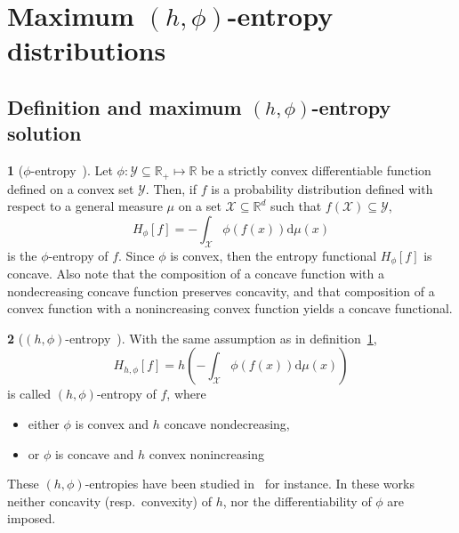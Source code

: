 \documentclass[english,sort&compress]{elsarticle}
\theoremstyle{definition}
\newtheorem{defn}{\protect\definitionname}
\theoremstyle{plain}
\theoremstyle{plain}
\providecommand{\definitionname}{Definition}
\def\dmu{\mathrm{d}\mu}
\def\Rset{\mathbb{R}}
\def\X{\mathcal{X}}
\def\Y{\mathcal{Y}}
\begin{document}

\section{Maximum $(h,\phi)$-entropy distributions}
\label{sec:MaxPhiEnt}



\subsection{Definition and maximum $(h,\phi)$-entropy solution}
\label{subsec:DefinitionPhiEnt}

\begin{defn}[$\phi$-entropy~\cite{Csi67, SalMen93, Sal94}]
\label{def:phi-entropy}
Let  $\phi:   \Y  \subseteq  \Rset_+   \mapsto  \Rset$  be  a   strictly  convex
differentiable function defined on a convex set $\Y$.  Then, if $f$ is
a probability distribution defined with respect  to a general measure $\mu$ on a
set $\X \subseteq \Rset^d$ such that $f(\X) \subseteq \Y$,
  \begin{equation}\label{eq:phi-entropy}
    H_\phi[f] = - \int_\X \phi(f(x)) \dmu(x)
  \end{equation}
  is  the $\phi$-entropy  of  $f$.  Since  $\phi$  is convex,  then the  entropy
  functional  $H_\phi[f]$ is  concave.   Also  note that  the  composition of  a
  concave function  with a  nondecreasing concave function  preserves concavity,
  and that composition of a convex function with a nonincreasing convex function
  yields a concave functional.
\end{defn}

\begin{defn}[$(h,\phi)$-entropy~\cite{Csi67, SalMen93, Sal94}]
\label{def:h_phi-entropy}
  With the same assumption as in definition~\ref{def:phi-entropy},
  \begin{equation}\label{eq:h-phi-entropy}
    H_{h,\phi}[f] = h\left( - \int_\X \phi(f(x)) \dmu(x) \right)
  \end{equation}
  is called $(h,\phi)$-entropy of $f$, where
  \begin{itemize}
  \item either $\phi$ is convex and $h$ concave nondecreasing,
  \item or $\phi$ is concave and $h$ convex nonincreasing
  \end{itemize}
\end{defn}
%
These $(h,\phi)$-entropies have been studied in~\cite{SalMen93, Sal94, MenMor97}
for instance.  In  these works neither concavity (resp.\  convexity) of $h$, nor
the differentiability of $\phi$ are imposed.
\end{document}
